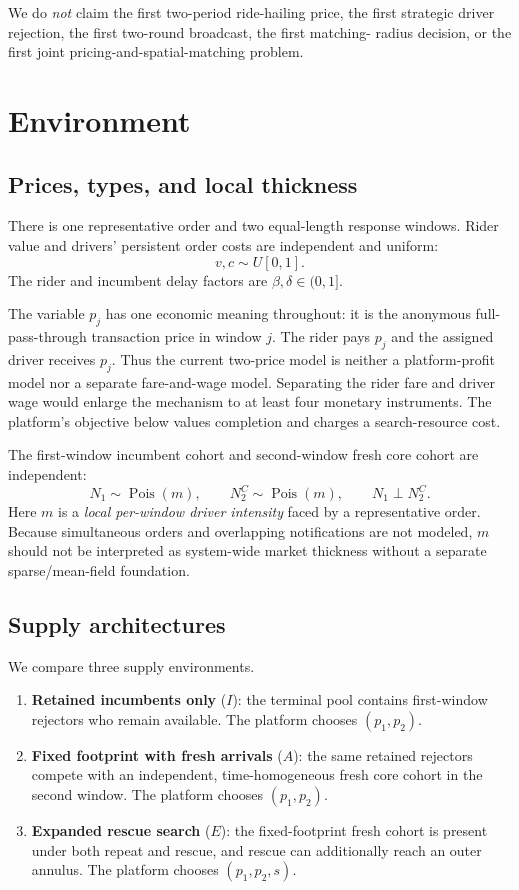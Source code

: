 \documentclass[11pt]{article}
\theoremstyle{definition}
\theoremstyle{remark}
\begin{document}
We do \emph{not} claim the first two-period ride-hailing price, the first
strategic driver rejection, the first two-round broadcast, the first matching-
radius decision, or the first joint pricing-and-spatial-matching problem.

\section{Environment}

\subsection{Prices, types, and local thickness}

There is one representative order and two equal-length response windows.
Rider value and drivers' persistent order costs are independent and uniform:
\[
v,c\sim U[0,1].
\]
The rider and incumbent delay factors are $\beta,\delta\in(0,1]$.

The variable $p_j$ has one economic meaning throughout: it is the anonymous
full-pass-through transaction price in window $j$.  The rider pays $p_j$ and
the assigned driver receives $p_j$.
Thus the current two-price model is neither a platform-profit model nor a
separate fare-and-wage model.  Separating the rider fare and driver wage would
enlarge the mechanism to at least four monetary instruments.  The platform's
objective below values completion and charges a search-resource cost.

The first-window incumbent cohort and second-window fresh core cohort are
independent:
\[
N_1\sim\operatorname{Pois}(m),\qquad
N_2^C\sim\operatorname{Pois}(m),\qquad N_1\perp N_2^C.
\]
Here $m$ is a \emph{local per-window driver intensity} faced by a
representative order.  Because simultaneous orders and overlapping
notifications are not modeled, $m$ should not be interpreted as system-wide
market thickness without a separate sparse/mean-field foundation.

\subsection{Supply architectures}

We compare three supply environments.

\begin{enumerate}[label=\textup{\Roman*.},leftmargin=2.4em]
\item \textbf{Retained incumbents only} ($I$): the terminal pool contains
first-window rejectors who remain available.  The platform chooses
$(p_1,p_2)$.
\item \textbf{Fixed footprint with fresh arrivals} ($A$): the same retained
rejectors compete with an independent, time-homogeneous fresh core cohort in
the second window.  The platform chooses $(p_1,p_2)$.
\item \textbf{Expanded rescue search} ($E$): the fixed-footprint fresh cohort
is present under both repeat and rescue, and rescue can additionally reach an
outer annulus.  The platform chooses $(p_1,p_2,s)$.
\end{enumerate}
\end{document}
